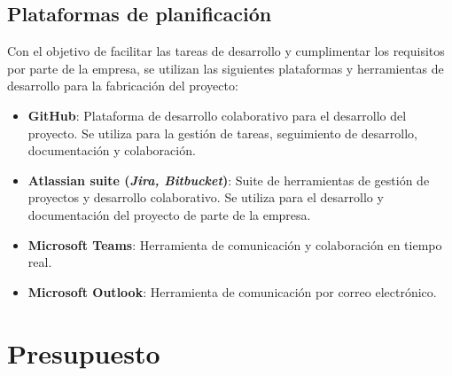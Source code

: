\subsection{Plataformas de planificación}\label{subsec:plataformas}
Con el objetivo de facilitar las tareas de desarrollo y cumplimentar los requisitos por parte
de la empresa, se utilizan las siguientes plataformas y herramientas de desarrollo para la
fabricación del proyecto:

\begin{itemize}
	\item \textbf{GitHub}: Plataforma de desarrollo colaborativo para el desarrollo del proyecto.
		Se utiliza para la gestión de tareas, seguimiento de desarrollo, documentación y
		colaboración.
	\item \textbf{Atlassian suite (\emph{Jira, Bitbucket})}: Suite de herramientas de gestión de proyectos
		y desarrollo colaborativo. Se utiliza para el desarrollo y documentación del proyecto de
		parte de la empresa.
	\item \textbf{Microsoft Teams}: Herramienta de comunicación y colaboración en tiempo real.
	\item \textbf{Microsoft Outlook}: Herramienta de comunicación por correo electrónico.
\end{itemize}

\newpage{}
\section{Presupuesto}\label{sec:presupuesto}
